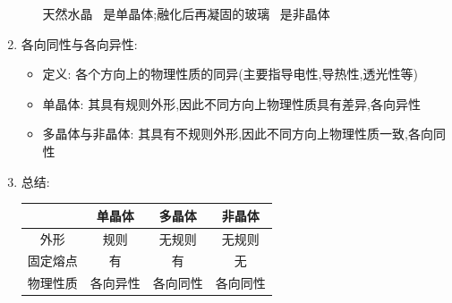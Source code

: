 \documentclass{article}
\begin{document}
\begin{enumerate}
\begin{itemize}
                    \hspace{4.8em}天然水晶 \, 是单晶体;融化后再凝固的玻璃 \, 是非晶体
          \end{itemize}

    \item 各向同性与各向异性:
          \begin{itemize}
              \item 定义: 各个方向上的物理性质的同异(主要指导电性,导热性,透光性等)
              \item 单晶体: 其具有规则外形,因此不同方向上物理性质具有差异,各向异性
              \item 多晶体与非晶体: 其具有不规则外形,因此不同方向上物理性质一致,各向同性
          \end{itemize}

    \item 总结:

          \hspace{3em}\begin{tabular}{|c|c|c|c|}
              \hline
                   & 单晶体  & 多晶体  & 非晶体  \\
              \hline
              外形   & 规则   & 无规则  & 无规则  \\
              \hline
              固定熔点 & 有    & 有    & 无    \\
              \hline
              物理性质 & 各向异性 & 各向同性 & 各向同性 \\
              \hline
          \end{tabular}
\end{enumerate}

\vspace{2em}
\end{document}
